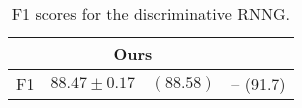 \begin{table}[h]
\center
\footnotesize
  \begin{tabular}{l|c|c}
        & Ours & \citet{dyer2016rnng}  \\ \hline
    F1  & $88.47 \pm	0.17 \quad (88.58)$ & -- \quad (91.7)
  \end{tabular}
  \caption{F1 scores for the discriminative RNNG.}
  \label{tab:disc-fscores}
\end{table}


